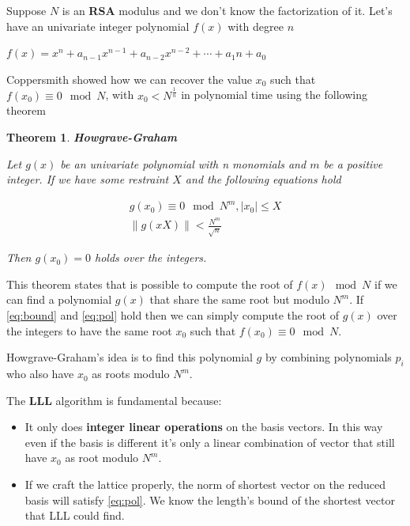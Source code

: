 \documentclass[a4paper,12pt]{report}
\newtheorem{theorem}{Theorem}[section]
\begin{document}
Suppose $N$ is an \textbf{RSA} modulus and we don't know the factorization of it. Let's have an univariate integer polynomial $f(x)$ with degree $n$

\begin{center}
    $f(x) = x^n + a_{n-1}x^{n-1} + a_{n-2}x^{n-2} + \cdots + a_1n + a_0$
\end{center}

Coppersmith showed how we can recover the value $x_0$ such that $f(x_0) \equiv 0 \mod N$, with $x_0 < N^{\frac{1}{n}}$ in polynomial time
using the following theorem

\begin{theorem}
    \textbf{Howgrave-Graham}
\end{theorem}

\textit{Let $g(x)$ be an univariate polynomial with n monomials and $m$ be a positive integer.
    If we have some restraint $X$ and the following equations hold}

\begin{center}
    \begin{eqnarray}
        g(x_0) \equiv 0 \mod N^m, |x_0| \le X \label{eq:bound} \\
         \lVert g(xX) \rVert < \frac{N^m}{\sqrt{n}} \label{eq:pol}
    \end{eqnarray}
\end{center}

\textit{Then $g(x_0) = 0$ holds over the integers.}

\vspace*{10px}

This theorem states that is possible to compute the root of $f(x) \mod N$ if we can find a polynomial $g(x)$ that share the same root but modulo $N^m$.
If \ref{eq:bound} and \ref{eq:pol} hold then we can simply compute the root of $g(x)$ over the integers to have the same root $x_0$
such that $f(x_0) \equiv 0 \mod N$.

Howgrave-Graham's idea is to find this polynomial $g$ by combining polynomials $p_i$ who also have $x_0$ as roots modulo $N^m$.

\vspace*{10px}

The \textbf{LLL} algorithm is fundamental because:

\begin{itemize}
    \item It only does \textbf{integer linear operations} on the basis vectors.
        In this way even if the basis is different it's only a linear combination of vector that still have $x_0$ as root
        modulo $N^m$.
    \item If we craft the lattice properly, the norm of shortest vector on the reduced basis will satisfy \ref{eq:pol}.
        We know the length's bound of the shortest vector that LLL could find.
\end{itemize}
\end{document}
